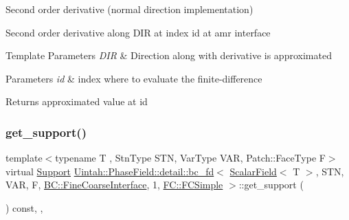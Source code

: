 Second order derivative (normal direction implementation) 

Second order derivative along D\+IR at index id at amr interface


\begin{DoxyTemplParams}{Template Parameters}
{\em D\+IR} & Direction along with derivative is approximated \\
\hline
\end{DoxyTemplParams}

\begin{DoxyParams}{Parameters}
{\em id} & index where to evaluate the finite-\/difference \\
\hline
\end{DoxyParams}
\begin{DoxyReturn}{Returns}
approximated value at id 
\end{DoxyReturn}
\mbox{\label{classUintah_1_1PhaseField_1_1detail_1_1bc__fd_3_01ScalarField_3_01T_01_4_00_01STN_00_01VAR_00_01ce55d0bf8381798bc129da931b626e80_a5538ce862e91e70376369ad7f4b17ba1}} 
\subsubsection{\texorpdfstring{get\+\_\+support()}{get\_support()}}
{\footnotesize\ttfamily template$<$typename T , Stn\+Type S\+TN, Var\+Type V\+AR, Patch\+::\+Face\+Type F$>$ \\
virtual \hyperlink{classUintah_1_1PhaseField_1_1Support}{Support} \hyperlink{classUintah_1_1PhaseField_1_1detail_1_1bc__fd}{Uintah\+::\+Phase\+Field\+::detail\+::bc\+\_\+fd}$<$ \hyperlink{structUintah_1_1PhaseField_1_1ScalarField}{Scalar\+Field}$<$ T $>$, S\+TN, V\+AR, F, \hyperlink{namespaceUintah_1_1PhaseField_a148fba372aa3be96fd6eede7a2fa10b5ad2d89be9637ff8b537fa4b6026c0e574}{B\+C\+::\+Fine\+Coarse\+Interface}, 1, \hyperlink{namespaceUintah_1_1PhaseField_aeb51fe956fe07f1487f5878f4039f27ca6a316dd1139b99e2a8af86106b3cf045}{F\+C\+::\+F\+C\+Simple} $>$\+::get\+\_\+support (\begin{DoxyParamCaption}{ }\end{DoxyParamCaption}) const\hspace{0.3cm}{\ttfamily [inline]}, {\ttfamily [override]}, {\ttfamily [virtual]}}



